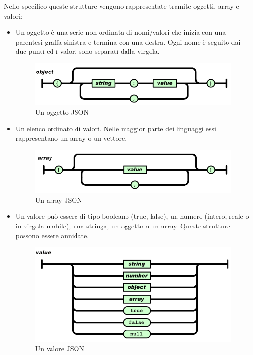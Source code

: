 Nello specifico queste strutture vengono rappresentate tramite oggetti, array e valori:
\begin{itemize}
\item Un oggetto è una serie non ordinata di nomi/valori che inizia con una parentesi graffa sinistra e termina con una destra. Ogni nome è seguito dai due punti ed i valori sono separati dalla virgola.
\begin{figure}[htb]
 \centering
 \includegraphics[width=0.9\linewidth]{images/chapter_architettura_sistema/oggetto_json.png}\hfill
 \caption[Un oggetto JSON]{Un oggetto JSON}
 \label{fig:architettura_sistema_oggetto_json}
\end{figure}
\item Un elenco ordinato di valori. Nelle maggior parte dei linguaggi essi rappresentano un array o un vettore.
\begin{figure}[htb]
 \centering
 \includegraphics[width=0.9\linewidth]{images/chapter_architettura_sistema/array_json.png}\hfill
 \caption[Un array JSON]{Un array JSON}
 \label{fig:architettura_sistema_array_json}
\end{figure}
\item Un valore può essere di tipo booleano (true, false), un numero (intero, reale o in virgola mobile), una stringa, un oggetto o un array. Queste strutture possono essere annidate.
\begin{figure}[htb]
 \centering
 \includegraphics[width=0.9\linewidth]{images/chapter_architettura_sistema/valore_json.png}\hfill
 \caption[Un valore JSON]{Un valore JSON}
 \label{fig:architettura_sistema_valore_json}
\end{figure}

\end{itemize}

